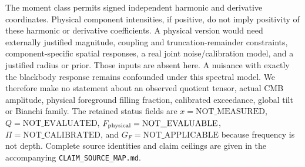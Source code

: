 \documentclass[aps,prd,onecolumn,11pt,nofootinbib,notitlepage]{revtex4-2}
\begin{document}
The moment class permits signed independent harmonic and derivative coordinates. Physical component intensities, if positive, do not imply positivity of these harmonic or derivative coefficients. A physical version would need externally justified magnitude, coupling and truncation-remainder constraints, component-specific spatial responses, a real joint noise/calibration model, and a justified radius or prior. Those inputs are absent here. A nuisance with exactly the blackbody response remains confounded under this spectral model. We therefore make no statement about an observed quotient tensor, actual CMB amplitude, physical foreground filling fraction, calibrated exceedance, global tilt or Bianchi family. The retained status fields are $x=\mathrm{NOT\_MEASURED}$, $Q=\mathrm{NOT\_EVALUATED}$, $F_{\rm physical}=\mathrm{NOT\_EVALUABLE}$, $\Pi=\mathrm{NOT\_CALIBRATED}$, and $G_F=\mathrm{NOT\_APPLICABLE}$ because frequency is not depth. Complete source identities and claim ceilings are given in the accompanying \texttt{CLAIM\_SOURCE\_MAP.md}.
\end{document}
